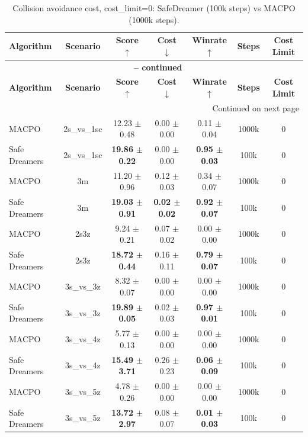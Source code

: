 \documentclass{article}
\begin{document}
\begin{longtable}{lcccccc}
\caption{Collision avoidance cost, cost\_limit=0: SafeDreamer (100k steps) vs MACPO (1000k steps).}
\label{tab:collision_comparison_100k_1m} \\
\toprule
\textbf{Algorithm} & \textbf{Scenario} & \textbf{Score} $\uparrow$ & \textbf{Cost} $\downarrow$ & \textbf{Winrate} $\uparrow$ & \textbf{Steps} & \textbf{Cost Limit} \\
\midrule
\endfirsthead
\multicolumn{7}{c}{{\bfseries \tablename\ \thetable{} -- continued}} \\
\toprule
\textbf{Algorithm} & \textbf{Scenario} & \textbf{Score} $\uparrow$ & \textbf{Cost} $\downarrow$ & \textbf{Winrate} $\uparrow$ & \textbf{Steps} & \textbf{Cost Limit} \\
\midrule
\endhead
\midrule \multicolumn{7}{r}{{Continued on next page}} \\
\endfoot
\bottomrule
\endlastfoot
MACPO & 2s\_vs\_1sc & 12.23 $\pm$ 0.48 & 0.00 $\pm$ 0.00 & 0.11 $\pm$ 0.04 & 1000k & 0 \\
Safe Dreamers & 2s\_vs\_1sc & \textbf{19.86 $\pm$ 0.22} & 0.00 $\pm$ 0.00 & \textbf{0.95 $\pm$ 0.03} & 100k & 0 \\
\midrule
MACPO & 3m & 11.20 $\pm$ 0.96 & 0.12 $\pm$ 0.03 & 0.34 $\pm$ 0.07 & 1000k & 0 \\
Safe Dreamers & 3m & \textbf{19.03 $\pm$ 0.91} & \textbf{0.02 $\pm$ 0.02} & \textbf{0.92 $\pm$ 0.07} & 100k & 0 \\
\midrule
MACPO & 2s3z & 9.24 $\pm$ 0.21 & 0.07 $\pm$ 0.02 & 0.00 $\pm$ 0.00 & 1000k & 0 \\
Safe Dreamers & 2s3z & \textbf{18.72 $\pm$ 0.44} & 0.16 $\pm$ 0.11 & \textbf{0.79 $\pm$ 0.07} & 100k & 0 \\
\midrule
MACPO & 3s\_vs\_3z & 8.32 $\pm$ 0.07 & 0.00 $\pm$ 0.00 & 0.00 $\pm$ 0.00 & 1000k & 0 \\
Safe Dreamers & 3s\_vs\_3z & \textbf{19.89 $\pm$ 0.05} & 0.02 $\pm$ 0.03 & \textbf{0.97 $\pm$ 0.01} & 100k & 0 \\
\midrule
MACPO & 3s\_vs\_4z & 5.77 $\pm$ 0.13 & 0.00 $\pm$ 0.00 & 0.00 $\pm$ 0.00 & 1000k & 0 \\
Safe Dreamers & 3s\_vs\_4z & \textbf{15.49 $\pm$ 3.71} & 0.26 $\pm$ 0.23 & \textbf{0.06 $\pm$ 0.09} & 100k & 0 \\
\midrule
MACPO & 3s\_vs\_5z & 4.78 $\pm$ 0.26 & 0.00 $\pm$ 0.00 & 0.00 $\pm$ 0.00 & 1000k & 0 \\
Safe Dreamers & 3s\_vs\_5z & \textbf{13.72 $\pm$ 2.97} & 0.08 $\pm$ 0.07 & \textbf{0.01 $\pm$ 0.03} & 100k & 0 \\

\end{longtable}
\end{document}
